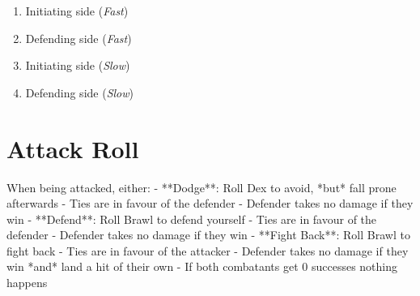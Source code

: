 \begin{enumerate}
    \item Initiating side (\textit{Fast})
    \item Defending side (\textit{Fast})
    \item Initiating side (\textit{Slow})
    \item Defending side (\textit{Slow})
\end{enumerate}


\section{Attack Roll}

When being attacked, either:
    - **Dodge**: Roll Dex to avoid, *but* fall prone afterwards
        - Ties are in favour of the defender
        - Defender takes no damage if they win
    - **Defend**: Roll Brawl to defend yourself
        - Ties are in favour of the defender
        - Defender takes no damage if they win
    - **Fight Back**: Roll Brawl to fight back  
        - Ties are in favour of the attacker
        - Defender takes no damage if they win *and* land a hit of their own
    - If both combatants get 0 successes nothing happens 



